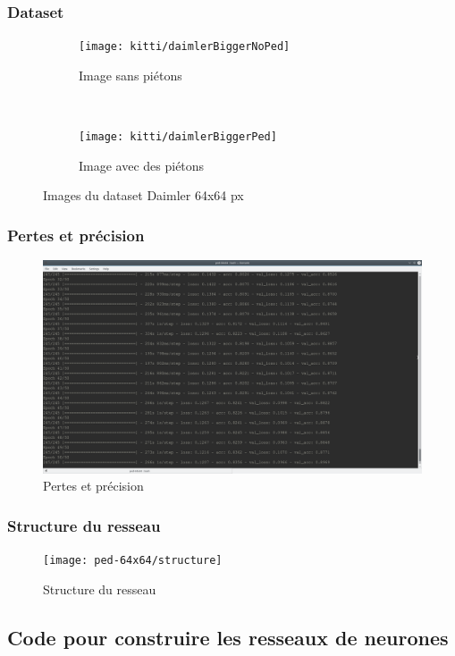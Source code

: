 \documentclass[14pt, oneside]{article} %
\begin{document}
			\subsubsection{Dataset}
			\newpage
				\begin{figure}[h!]
					\raggedright
					\begin{subfigure}[b]{0.4\textwidth}
						\texttt{[image: kitti/daimlerBiggerNoPed]}
						\caption{Image sans pi\'{e}tons}
					\end{subfigure}	
					~
					\begin{subfigure}[b]{0.4\textwidth}	
						\texttt{[image: kitti/daimlerBiggerPed]}
						\caption{Image avec des pi\'{e}tons}
					\end{subfigure}	
					\caption{Images du dataset Daimler 64x64 px}
					\label{daimlerImgBigger}
				\end{figure}
				
			\subsubsection{Pertes et précision}
				\begin{figure}[h!]
					\raggedright
					\includegraphics[width=\textwidth]{ped-64x64/consoleLogs}
					\caption{Pertes et précision}
					\label{PertesPrecisionBigger}
				\end{figure}
				\newpage
			\subsubsection{Structure du resseau}
				\begin{figure}[h!]
					\raggedright
					\texttt{[image: ped-64x64/structure]}
					\caption{Structure du resseau}
				\end{figure}		
				\newpage
		\subsection{Code pour construire les resseaux de neurones}
		
\end{document}
